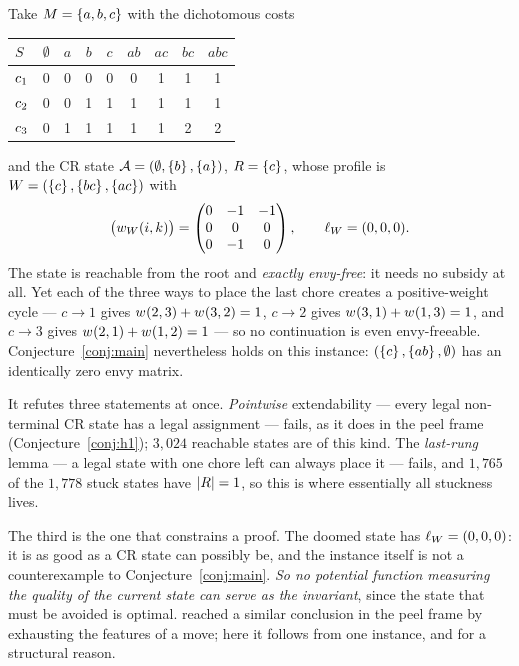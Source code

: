 \begin{example}
\label{ex:cri-deadend}
Take $M = \left\{a,b,c\right\}$ with the dichotomous costs
\begin{center}\small
\begin{tabular}{@{}lcccccccc@{}}
\toprule
$S$ & $\emptyset$ & $a$ & $b$ & $c$ & $ab$ & $ac$ & $bc$ & $abc$ \\
\midrule
$c_1$ & 0 & 0 & 0 & 0 & 0 & 1 & 1 & 1 \\
$c_2$ & 0 & 0 & 1 & 1 & 1 & 1 & 1 & 1 \\
$c_3$ & 0 & 1 & 1 & 1 & 1 & 1 & 2 & 2 \\
\bottomrule
\end{tabular}
\end{center}
and the CR state $\mathcal{A} = (\emptyset, \left\{b\right\}, \left\{a\right\})$, $R = \left\{c\right\}$, whose
profile is $W = (\left\{c\right\},\left\{bc\right\},\left\{ac\right\})$ with
\[
  \big(w_{W}(i,k)\big) =
  \begin{pmatrix} 0 & -1 & -1 \\ 0 & 0 & 0 \\ 0 & -1 & 0 \end{pmatrix},
  \qquad \ell_{W} = (0,0,0).
\]
The state is reachable from the root and \emph{exactly envy-free}: it needs no
subsidy at all. Yet each of the three ways to place the last chore creates a
positive-weight cycle --- $c \to 1$ gives $w_{}(2,3) + w_{}(3,2) = 1$,
$c \to 2$ gives $w_{}(3,1) + w_{}(1,3) = 1$, and $c \to 3$ gives
$w_{}(2,1) + w_{}(1,2) = 1$ --- so no continuation is even
envy-freeable. Conjecture~\ref{conj:main} nevertheless holds on this instance:
$(\left\{c\right\},\left\{ab\right\},\emptyset)$ has an identically zero envy matrix.
\end{example}

\begin{remark}
\label{rem:cri-nopotential}
It refutes three statements at once. \emph{Pointwise} extendability --- every
legal non-terminal CR state has a legal assignment --- fails, as it does in the
peel frame (Conjecture~\ref{conj:h1}); $3{,}024$ reachable states are of this
kind. The \emph{last-rung} lemma --- a legal state with one chore left can
always place it --- fails, and $1{,}765$ of the $1{,}778$ stuck states have
$\left\lvert R\right\rvert = 1$, so this is where essentially all stuckness lives.

The third is the one that constrains a proof. The doomed state has
$\ell_{W} = (0,0,0)$: it is as good as a CR state can possibly be,
and the instance itself is not a counterexample to
Conjecture~\ref{conj:main}. \emph{So no potential function measuring the quality
of the current state can serve as the invariant}, since the state that must be
avoided is optimal.  reached a similar
conclusion in the peel frame by exhausting the features of a move; here it
follows from one instance, and for a structural reason.
\end{remark}

